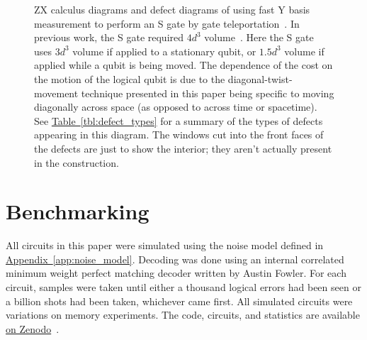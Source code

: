 \documentclass[onecolumn,unpublished,a4paper]{quantumarticle}
\theoremstyle{definition}
\theoremstyle{definition}
\theoremstyle{definition}
\DeclareRobustCommand{\app}[1]{\hyperref[app:#1]{Appendix~\ref*{app:#1}}}
\newcommand{\tbl}[1]{\hyperref[tbl:#1]{Table~\ref*{tbl:#1}}}
\begin{document}
\begin{figure}
    \centering
    \caption{
        ZX calculus diagrams and defect diagrams of using fast Y basis measurement to perform an S gate by gate teleportation~\cite{gottesman1999gateteleport}.
        In previous work, the S gate required $4 d^3$  volume~\cite{bombin2021logical,chamberland2022universal}.
        Here the S gate uses $3 d^3$ volume if applied to a stationary qubit, or $1.5d^3$ volume if applied while a qubit is being moved.
        The dependence of the cost on the motion of the logical qubit is due to the diagonal-twist-movement technique presented in this paper being specific to moving diagonally across space (as opposed to across time or spacetime).
        See \tbl{defect_types} for a summary of the types of defects appearing in this diagram.
        The windows cut into the front faces of the defects are just to show the interior; they aren't actually present in the construction.
    }
    \label{fig:other_improvements}
\end{figure}





\section{Benchmarking}
\label{sec:benchmarking}

All circuits in this paper were simulated using the noise model defined in \app{noise_model}.
Decoding was done using an internal correlated minimum weight perfect matching decoder written by Austin Fowler.
For each circuit, samples were taken until either a thousand logical errors had been seen or a billion shots had been taken, whichever came first.
All simulated circuits were variations on memory experiments.
The code, circuits, and statistics are available \href{https://doi.org/10.5281/zenodo.7487893}{on Zenodo}~\cite{gidneyybasisdata2022}.
\end{document}
